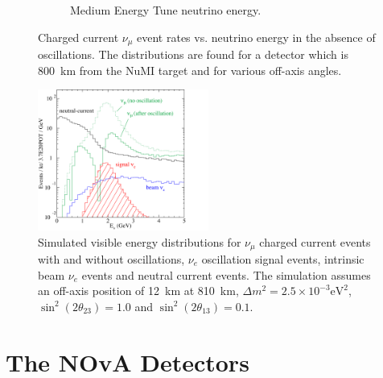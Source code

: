 \begin{figure}
\begin{subfigure}[b]{0.45\textwidth}
    \caption{Medium Energy Tune neutrino energy.}
    \label{fig:NuESpectra_MEAndLE_b}
  \end{subfigure}
  \caption{Charged current $\nu_{\mu}$ event rates vs. neutrino
    energy in the absence of oscillations. The distributions are found
  for a detector which is 800~km from the NuMI target and for various
  off-axis angles.}
  \label{fig:NuESpectra_MEAndLE}
\end{figure}


\begin{figure}
  \centering
  \includegraphics[width=0.5\textwidth]{../../img/beam/060-sig-and-bg-rates-thumb.png}
  \caption{Simulated visible energy distributions for $\nu_{\mu}$ charged current
    events with and without oscillations, $\nu_e$ oscillation signal events,
    intrinsic beam $\nu_e$ events and neutral current events. The
    simulation assumes an off-axis position of 12~km at 810~km, $\Delta m^2 = 2.5 \times 10^{-3}
    \textrm{eV}^2$, $\sin^2(2\theta_{23}) = 1.0$ and
  $\sin^2(2\theta_{13}) = 0.1$.}
  \label{fig:NuMIBeamComp}
\end{figure}


\section{The NOvA Detectors}




